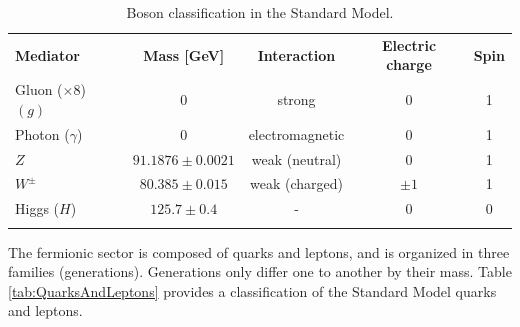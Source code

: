 \begin{table}[!ht]
  \begin{center}
    \begin{small}
      \setlength{\tabcolsep}{0.0pc}
      \begin{tabular*}{\textwidth}{@{\extracolsep{\fill}}lcccc}
        \noalign{\smallskip}\hline\noalign{\smallskip}
         {\bf Mediator}               & {\bf Mass [GeV]}     & {\bf Interaction} & {\bf Electric charge} & {\bf Spin} \\
        \noalign{\smallskip}\hline\noalign{\smallskip}
         Gluon ($\times 8$) $(g)$     & 0                    & strong            & 0                     & 1 \\
         Photon ($\gamma$)            & 0                    & electromagnetic   & 0                     & 1 \\
         $Z$                          & $91.1876 \pm 0.0021$ & weak (neutral)    & 0                     & 1 \\
         $W^{\pm}$                    & $80.385 \pm 0.015$   & weak (charged)    & $\pm 1$               & 1 \\
         Higgs ($H$)                  & $125.7 \pm 0.4$      & -                 & 0                     & 0 \\
        \noalign{\smallskip}\hline\noalign{\smallskip}
      \end{tabular*}
    \end{small}
  \end{center}
  \caption[Bosonic fields in the Standard Model.]{Boson classification in the Standard Model.}
  \label{tab:bosons}
\end{table}

The fermionic sector is composed of quarks and leptons, and is organized in three families (generations).
Generations only differ one to another by their mass.
Table \ref{tab:QuarksAndLeptons} provides a classification of the Standard Model quarks and leptons.

